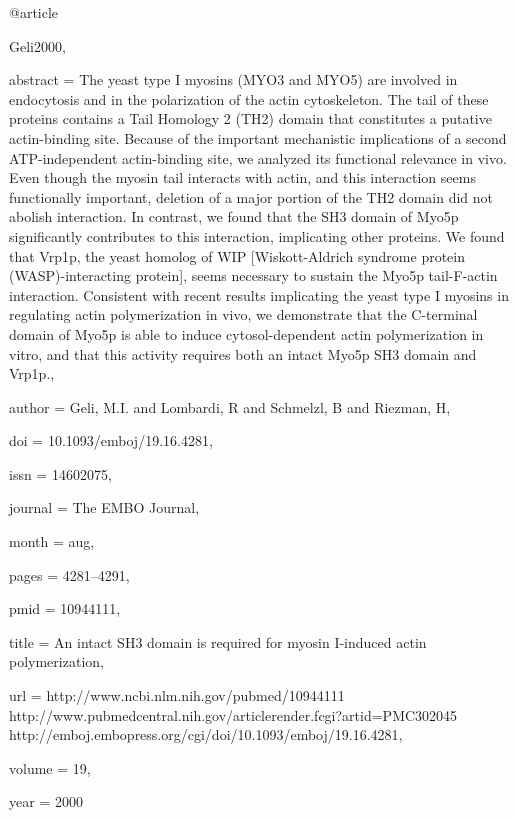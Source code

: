 @article{Geli2000,

abstract = {The yeast type I myosins (MYO3 and MYO5) are involved in endocytosis and in the polarization of the actin cytoskeleton. The tail of these proteins contains a Tail Homology 2 (TH2) domain that constitutes a putative actin-binding site. Because of the important mechanistic implications of a second ATP-independent actin-binding site, we analyzed its functional relevance in vivo. Even though the myosin tail interacts with actin, and this interaction seems functionally important, deletion of a major portion of the TH2 domain did not abolish interaction. In contrast, we found that the SH3 domain of Myo5p significantly contributes to this interaction, implicating other proteins. We found that Vrp1p, the yeast homolog of WIP [Wiskott-Aldrich syndrome protein (WASP)-interacting protein], seems necessary to sustain the Myo5p tail-F-actin interaction. Consistent with recent results implicating the yeast type I myosins in regulating actin polymerization in vivo, we demonstrate that the C-terminal domain of Myo5p is able to induce cytosol-dependent actin polymerization in vitro, and that this activity requires both an intact Myo5p SH3 domain and Vrp1p.},

author = {Geli, M.I. and Lombardi, R and Schmelzl, B and Riezman, H},

doi = {10.1093/emboj/19.16.4281},

issn = {14602075},

journal = {The EMBO Journal},

month = {aug},

pages = {4281--4291},

pmid = {10944111},

title = {{An intact SH3 domain is required for myosin I-induced actin polymerization}},

url = {http://www.ncbi.nlm.nih.gov/pubmed/10944111 http://www.pubmedcentral.nih.gov/articlerender.fcgi?artid=PMC302045 http://emboj.embopress.org/cgi/doi/10.1093/emboj/19.16.4281},

volume = {19},

year = {2000}

}

